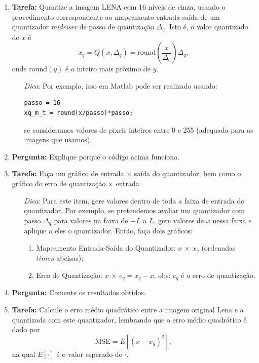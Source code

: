 \documentclass[11pt]{article}
\begin{document}
\begin{enumerate}

\item \textbf{Tarefa:} Quantize a imagem \textsf{LENA} com 16 níveis de cinza, usando o procedimento correspondente ao mapeamento entrada-saída de um quantizador \emph{midriser} de passo de quantização $\Delta_q$. Isto é, o valor quantizado de $x$ é
\begin{equation} 
x_q = Q(x,\Delta_q) = \textrm{round} \left ( \frac{x}{\Delta_q} \right ) \Delta_q,
\end{equation}
onde $\textrm{round}(y) $ é o inteiro mais próximo de $y$. 

\begin{itemize}
\item[\textit{Dica}:] Por exemplo, isso em \textsf{Matlab} pode ser realizado usando:

\begin{verbatim}
passo = 16
xq_m_t = round(x/passo)*passo;
\end{verbatim}

\noindent se consideramos valores de pixeis inteiros entre 0 e 255 (adequada para as imagens que usamos). 
\end{itemize}

\item \textbf{Pergunta:} Explique porque o código acima funciona.

\item \textbf{Tarefa:} Faça um gráfico de entrada $\times$ saída do quantizador, bem como o gráfico do erro de quantização $\times$ entrada. 

\begin{itemize}
\item[\textit{Dica}:] Para este item, gere valores dentro de toda a faixa de entrada do quantizador. Por exemplo, se pretendemos avaliar um quantizador com passo $\Delta_q$ para valores na faixa de $-L$ a $L$, gere valores de $x$ nessa faixa e aplique a eles o quantizador. Então, faça dois gráficos:
\begin{enumerate}
\item Mapeamento Entrada-Saída do Quantizador: $x$ $\times$ $x_q$ (ordenadas $times$ abcisas);
\item Erro de Quantização: $x$ $\times$ $e_q= x_q-x$, obs: $e_q$ é o erro de quantização.
\end{enumerate}
\end{itemize}

\item \textbf{Pergunta:} Comente os resultados obtidos.

\item \textbf{Tarefa:} Calcule o erro médio quadrático entre a imagem original Lena e a quantizada com este quantizador, lembrando que o erro médio quadrático é dado por
\begin{equation}
\textrm{MSE} = E \left [ \left (x-x_q \right )^2 \right ],
\end{equation}
na qual $E[\cdot]$ é o valor esperado de $\cdot$.
\end{enumerate}
\end{document}

